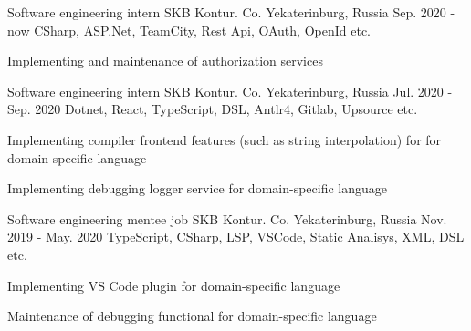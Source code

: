 

\begin{cventries}

  \cventryT
    {Software engineering intern} %
    {SKB Kontur. Co.} %
    {Yekaterinburg, Russia} %
    {Sep. 2020 - now} %
    {CSharp, ASP.Net, TeamCity, Rest Api, OAuth, OpenId etc.} %
    {
      \begin{cvitems} %
        \item {Implementing and maintenance of authorization services}
      \end{cvitems}
    }

  \cventryT
    {Software engineering intern} %
    {SKB Kontur. Co.} %
    {Yekaterinburg, Russia} %
    {Jul. 2020 - Sep. 2020} %
    {Dotnet, React, TypeScript, DSL, Antlr4, Gitlab, Upsource etc.} %
    {
      \begin{cvitems} %
        \item {Implementing compiler frontend features (such as string interpolation) for for domain-specific language}
        \item {Implementing debugging logger service for domain-specific language}
      \end{cvitems}
    }

  \cventryT
    {Software engineering mentee job} %
    {SKB Kontur. Co.} %
    {Yekaterinburg, Russia} %
    {Nov. 2019 - May. 2020} %
    {TypeScript, CSharp, LSP, VSCode, Static Analisys, XML, DSL etc.} %
    {
      \begin{cvitems} %
        \item {Implementing VS Code plugin for domain-specific language}
        \item {Maintenance of debugging functional for domain-specific language}
      \end{cvitems}
    }
\end{cventries}

